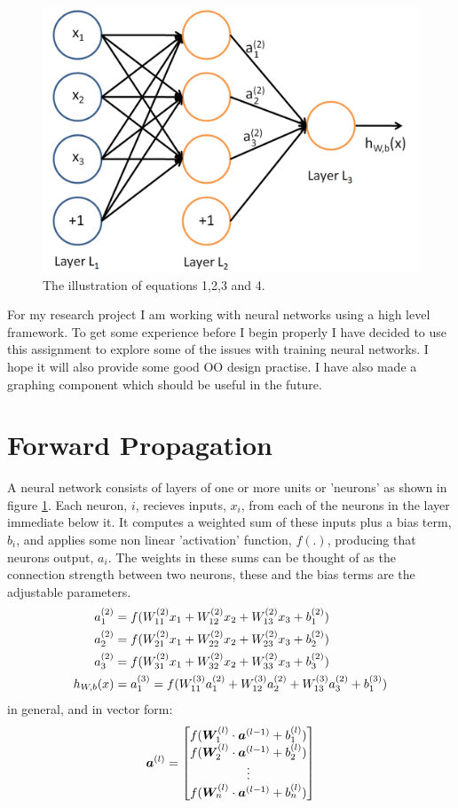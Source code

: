 \documentclass[11pt]{article} %
\begin{document}
\begin{figure}
\centering
\includegraphics*[width=0.4\linewidth,clip]{NNfig1}
\caption{The illustration of equations 1,2,3 and 4. 
\label{NNfig1}  } 
\end{figure}

For my research project I am working with neural networks using a high level framework. To get some experience before I begin properly I have decided to use this assignment to explore some of the issues with training neural networks. I hope it will also provide some good OO design practise. I have also made a graphing component which should be useful in the future.


\section{Forward Propagation}

A neural network consists of layers of one or more units or 'neurons' as shown in figure \ref{NNfig1}. Each neuron, $i$,  recieves inputs, $x_i$, from each of the neurons in the layer immediate below it. It computes a weighted sum of these inputs plus a bias term, $b_i$, and applies some non linear 'activation' function, $f(.)$, producing that neurons output, $a_i$. The weights in these sums can be thought of as the connection strength between two neurons, these and the bias terms are the adjustable parameters.
\begin{align}
\centering
a_1^{(2)} &= f(W_{11}^{(2)}x_1 + W_{12}^{(2)} x_2 + W_{13}^{(2)} x_3 + b_1^{(2)})  \\
a_2^{(2)} &= f(W_{21}^{(2)}x_1 + W_{22}^{(2)} x_2 + W_{23}^{(2)} x_3 + b_2^{(2)})  \\
a_3^{(2)} &= f(W_{31}^{(2)}x_1 + W_{32}^{(2)} x_2 + W_{33}^{(2)} x_3 + b_3^{(2)})  \\
h_{W,b}(x) &= a_1^{(3)} =  f(W_{11}^{(3)}a_1^{(2)} + W_{12}^{(3)} a_2^{(2)} + W_{13}^{(3)} a_3^{(2)} + b_1^{(3)}) 
\end{align}
in general, and in vector form:
\begin{align}
\centering
\boldsymbol a^{(l)} = 
\begin{bmatrix}
f(\boldsymbol W^{(l)}_1\cdot \boldsymbol a^{(l-1)} +b^{(l)}_1)\\ 
f(\boldsymbol W^{(l)}_2\cdot \boldsymbol a^{(l-1)} +b^{(l)}_2)\\ 
\vdots\\ 
f(\boldsymbol W^{(l)}_n\cdot \boldsymbol a^{(l-1)} +b^{(l)}_n)\\
\end{bmatrix}
\end{align}
\end{document}

